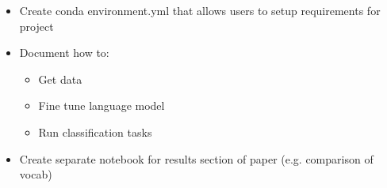 \documentclass{amia}
\begin{document}
\begin{itemize}
	\item Create conda environment.yml that allows users to setup requirements for project
  \item Document how to:
  \begin{itemize}
    \item Get data
    \item Fine tune language model
    \item Run classification tasks
  \end{itemize}
  \item Create separate notebook for results section of paper (e.g. comparison of vocab)
\end{itemize}



\end{document}
